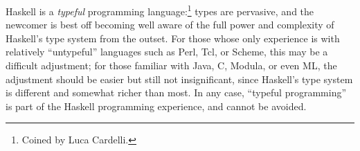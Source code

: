
Haskell is a {\em typeful} programming language:\footnote{Coined by Luca Cardelli.} types are pervasive, and the newcomer is best off
becoming well aware of the full power and complexity of Haskell's type
system from the outset.  For those whose only experience is with
relatively ``untypeful'' languages such as Perl, Tcl, or Scheme, this may be
a difficult adjustment; for those familiar with Java, C, Modula, or
even ML, the adjustment should be easier but still not insignificant,
since Haskell's type system is different and somewhat richer than
most.  In any case, ``typeful programming'' is part of the Haskell
programming experience, and cannot be avoided.


